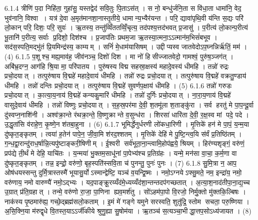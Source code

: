 6.1.4
त्रीणि॑ प॒दा निहि॑ता॒ गुहा॑सु॒ यस्तद्वेद॑ सवि॒तुः पि॒ताऽस॑त् । स नो॒ बन्धु॑र्जनि॒ता स वि॑धा॒ता धामा॑नि॒ वेद॒ भुव॑नानि॒ विश्वा । यत्र॑ दे॒वा अ॒मृत॑मानशा॒नास्तृ॒तीये॒ धामान्य॒भ्यैर॑यन्त । परि॒ द्यावा॑पृथि॒वी य॑न्ति स॒द्यः परि॑ लो॒कान् परि॒ दिशः॒ परि॒ सुवः॑ । ऋ॒तस्य॒ तन्तु॑व्विँततव्विँ॒चृत्य॒ तद॑पश्य॒त्तद॑भवत् प्र॒जासु॑ । प॒रीत्य॑ लो॒कान्प॒रीत्य॑ भू॒तानि॑ प॒रीत्य॒ सर्वाः प्र॒दिशो॒ दिश॑श्च । प्र॒जाप॑तिः प्रथम॒जा ऋ॒तस्या॒त्मना॒ऽऽत्मान॑म॒भिसं॑बभूव । सद॑स॒स्पति॒मद्भु॑तं प्रि॒यमिन्द्र॑स्य॒ काम्यम् । सनिं॑ मे॒धाम॑यासिषम् । उद्दीप्यस्व जातवेदोऽप॒घ्नन्निर्\mbox{}ऋ॑तिं॒ मम॑ । (4)
6.1.5
प॒शूश्च॒ मह्य॒माव॑ह॒ जीव॑नञ्च॒ दिशो॑ दिश । मा नो॑ हिसीज्जातवेदो॒ गामश्वं॒ पुरु॑ष॒ञ्जग॑त् । अबि॑भ्र॒दग्न॒ आग॑हि श्रि॒या मा॒ परि॑पातय । पुरु॑षस्य विद्म सहस्रा॒क्षस्य॑ महादे॒वस्य॑ धीमहि । तन्नो॑ रुद्रः प्रचो॒दयात् । तत्पुरु॑षाय वि॒द्महे॑ महादे॒वाय॑ धीमहि । तन्नो॑ रुद्रः प्रचो॒दयात् । तत्पुरु॑षाय वि॒द्महे॑ वक्रतु॒ण्डाय॑ धीमहि । तन्नो॑ दन्तिः प्रचो॒दयात् । तत्पुरु॑षाय वि॒द्महे॑ सुवर्णप॒क्षाय॑ धीमहि । (5)
6.1.6
तन्नो॑ गरुडः प्रचो॒दयात् । का॒त्या॒य॒नाय॑ वि॒द्महे॑ कन्यकु॒मारि॑ धीमहि । तन्नो॑ दुर्गिः प्रचो॒दयात् । ना॒रा॒य॒णाय॑ वि॒द्महे॑ वासुदे॒वाय॑ धीमहि । तन्नो॑ विष्णुः प्रचो॒दयात् । स॒ह॒स्र॒पर॑मा दे॒वी॒ श॒तमू॑ला श॒ताङ्कु॑रा । सर्व हरतु॑ मे पा॒प॒न्दू॒र्वा दु॑स्वप्न॒नाशि॑नी । अश्व॑क्रा॒न्ते र॑थक्रा॒न्ते॒ वि॒ष्णुक्रान्ते व॒सुन्ध॑रा । शिरसा॑ धारि॑ता दे॒वी॒ र॒क्ष॒स्व मां पदे॒ पदे । उ॒द्धृता॑सि व॑राहे॒ण॒ कृ॒ष्णे॒न श॑तबा॒हुना । (6)
6.1.7
भूमिर्द्धेनुर्धरणी लो॑कधा॒रिणी । मृ॒त्तिके॑ हन॑ मे पा॒पं॒ य॒न्म॒या दु॑ष्कृत॒ङ्कृतम् । त्वया॑ ह॒तेन॑ पापे॒न॒ जी॒वा॒मि श॑रद॒श्शतम् । मृ॒त्तिके॑ देहि॑ मे पु॒ष्टि॒न्त्व॒यि स॑र्वं प्र॒तिष्ठि॑तम् । ग॒न्ध॒द्वा॒रान्दु॑राध॒र्\mbox{}षान्नि॒त्यपु॑ष्टाङ्करी॒षिणीम् । ई॒श्वरी सर्व॑भूता॒ना॒न्त्वामि॒होप॑ह्वये॒ श्रियम् । हिर॑ण्यशृङ्गं॒ वरु॑णं॒ प्रप॑द्ये ती॒र्थं मे देहि॒ याचि॑तः । य॒न्मया॑ भु॒क्तम॒साधू॑नां पा॒पेभ्य॑श्च प्र॒तिग्र॑हः । यन्मे॒ मन॑सा वा॒चा॒ क॒र्म॒णा वा दु॑ष्कृत॒ङ्कृतम् । तन्न॒ इन्द्रो॒ वरु॑णो॒ बृह॒स्पति॑स्सवि॒ता च॑ पुनन्तु॒ पुनः॑ पुनः । (7)
6.1.8
सु॒मि॒त्रा न॒ आप॒ ओष॑धयस्सन्तु दुर्मि॒त्रास्तस्मै॑ भूयासु॒र्योऽस्मान्द्वेष्टि॒ यञ्च॑ व॒यन्द्वि॒ष्मः । नमो॒ऽग्नयेऽफ्सु॒मते॒ नम॒ इन्द्रा॑य॒ नमो॒ वरु॑णाय॒ नमो वारुण्यै॑ नमो॒ऽद्भ्यः । यद॒पाङ्क्रू॒रय्यँद॑मे॒ध्यय्यँद॑शा॒न्तन्तदप॑गच्छतात् । अ॒त्या॒श॒नाद॑तीपा॒ना॒द्य॒च्च उ॒ग्रात् प्र॑ति॒ग्रहात् । तन्मे॒ वरु॑णो रा॒जा॒ पा॒णिना ह्यव॒मर्\mbox{}श॑तु । सो॑ऽहम॑पा॒पो वि॒रजो॒ निर्मु॒क्तो मु॑क्तकि॒ल्बिषः । नाक॑स्य पृ॒ष्ठमारु॑ह्य॒ गच्छे॒द्ब्रह्म॑सलो॒कताम् । इ॒मं मे॑ गङ्गे यमुने सरस्वति॒ शुतु॑द्रि॒ स्तोम सचता॒ परु॒ष्णिया । अ॒सि॒क्नि॒या म॑रुद्वृधे वि॒तस्त॒याऽऽर्जी॑कीये श्रुणु॒ह्या सु॒षोम॑या । ऋ॒तञ्च॑ स॒त्यञ्चा॒भीद्धा॒त्तप॒सोऽध्य॑जायत । (8)
